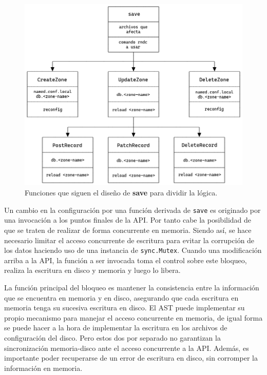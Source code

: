 \begin{figure}[!ht]
    \centering
    \includegraphics[width=\linewidth]{draws/split-save.png}
    \caption{Funciones que siguen el diseño de \textbf{save} para dividir la lógica.}
    \label{fig:split-save}
\end{figure}

Un cambio en la configuración por una función derivada de \verb|save| es originado por una invocación a los puntos finales de la API. Por tanto cabe la posibilidad de que se traten de realizar de forma concurrente en memoria. Siendo así, se hace necesario limitar el acceso concurrente de escritura para evitar la corrupción de los datos haciendo uso de una instancia de \verb|sync.Mutex|. Cuando una modificación arriba a la API, la función a ser invocada toma el control sobre este bloqueo, realiza la escritura en disco y memoria y luego lo libera.

La función principal del bloqueo es mantener la consistencia entre la información que se encuentra en memoria y en disco, asegurando que cada escritura en memoria tenga su sucesiva escritura en disco. El AST puede implementar su propio mecanismo para manejar el acceso concurrente en memoria, de igual forma se puede hacer a la hora de implementar la escritura en los archivos de configuración del disco. Pero estos dos por separado no garantizan la sincronización memoria-disco ante el acceso concurrente a la API. Además, es importante poder recuperarse de un error de escritura en disco, sin corromper la información en memoria.


